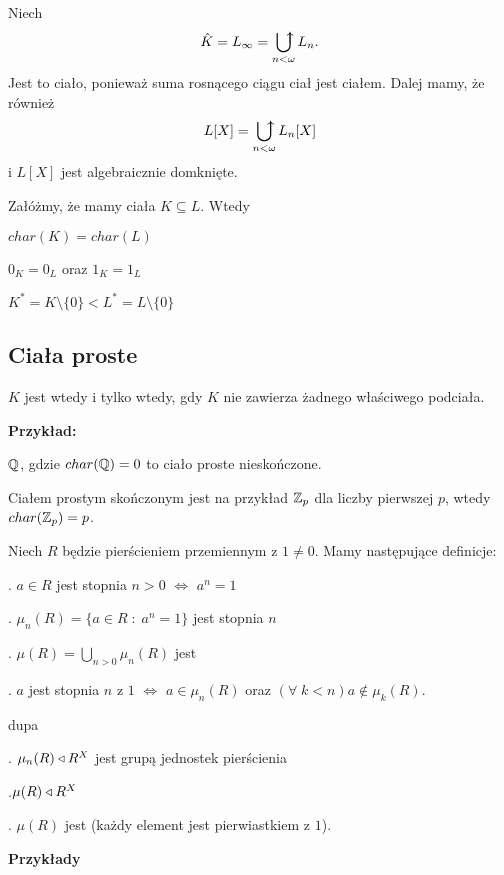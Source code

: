 Niech
$$\hat{K}=L_\infty=\ubigcup\limits_{n<\omega}L_n.$$
Jest to ciało, ponieważ suma rosnącego ciągu ciał jest ciałem. Dalej mamy, że również
$$L[X]=\ubigcup\limits_{n<\omega}L_n[X]$$
i $L[X]$ jest algebraicznie domknięte.

\begin{uwaga}
    Załóżmy, że mamy ciała $K\subseteq L$. Wtedy

\indent \point $char(K)=char(L)$

\indent \point $0_K=0_L$ oraz $1_K=1_L$

\indent \point $K^*=K\setminus\{0\}<L^*=L\setminus\{0\}$
\end{uwaga}

\subsection{Ciała proste}

$K$ jest  wtedy i tylko wtedy, gdy $K$ nie zawierza żadnego właściwego podciała. 

\textbf{Przykład:}

\indent \point $\mathbb{Q}$, gdzie $char(\mathbb{Q})=0$ to ciało proste nieskończone.

\indent \point Ciałem prostym skończonym jest na przykład $\mathbb{Z}_p$ dla liczby pierwszej $p$, wtedy $char(\mathbb{Z}_p)=p$.
\medskip

Niech $R$ będzie pierścieniem przemiennym z $1\neq0$. Mamy następujące definicje:

. $a\in R$ jest stopnia $n>0$ $\iff$ $a^n=1$

. $\mu_n(R)=\{a\in R\;:\;a^n=1\}$ jest  stopnia $n$

. $\mu(R)=\bigcup\limits_{n>0}\mu_n(R)$ jest 

. $a$ jest  stopnia $n$ z $1$ $\iff$ $a\in\mu_n(R)$ oraz $(\forall\;k<n)a\notin\mu_k(R)$.

\begin{uwaga}{\color{back}dupa}

. $\mu_n(R)\triangleleft R^X$ jest grupą jednostek pierścienia

.$\mu(R)\triangleleft R^X$

. $\mu(R)$ jest  (każdy element jest pierwiastkiem z $1$).
\end{uwaga}

\textbf{Przykłady}

